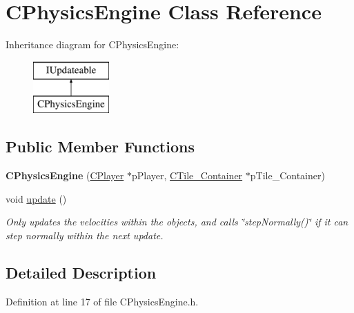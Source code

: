 \hypertarget{classCPhysicsEngine}{\section{C\-Physics\-Engine Class Reference}
\label{classCPhysicsEngine}
}
Inheritance diagram for C\-Physics\-Engine\-:\begin{figure}[H]
\begin{center}
\leavevmode
\includegraphics[height=2.000000cm]{classCPhysicsEngine}
\end{center}
\end{figure}
\subsection*{Public Member Functions}
\begin{DoxyCompactItemize}
\item 
\hypertarget{classCPhysicsEngine_ab7a2fa6ebd7e1ad0da2ab36d92ae8608}{{\bfseries C\-Physics\-Engine} (\hyperlink{classCPlayer}{C\-Player} $\ast$p\-Player, \hyperlink{classCTile__Container}{C\-Tile\-\_\-\-Container} $\ast$p\-Tile\-\_\-\-Container)}\label{classCPhysicsEngine_ab7a2fa6ebd7e1ad0da2ab36d92ae8608}

\item 
void \hyperlink{classCPhysicsEngine_abc493897bbdb15e6787a25478730f1f5}{update} ()
\begin{DoxyCompactList}\small\item\em Only updates the velocities within the objects, and calls \char`\"{}step\-Normally()\char`\"{} if it can step normally within the next update. \end{DoxyCompactList}\end{DoxyCompactItemize}


\subsection{Detailed Description}


Definition at line 17 of file C\-Physics\-Engine.\-h.



